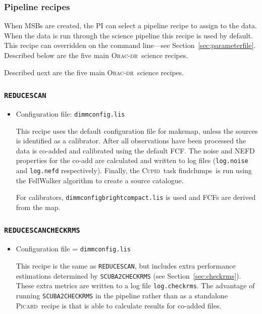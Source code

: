 \documentclass[twoside,11pt]{article}
\newcommand{\htmladdnormallink}[2]{#1}
\newcommand{\htmlref}[2]{#1}
\newenvironment{latexonly}{}{}
\newcommand{\latexhtml}[2]{#1}
\newcommand{\xref}[3]{#1}
\newcommand{\xlabel}[1]{}
\renewcommand{\_}{\texttt{\symbol{95}}}
\newcommand{\cupid}{\xref{\textsc{Cupid}}{sun255}{}}
\newcommand{\oracdr}{\htmladdnormallink{\textsc{Orac-dr}}{http://www.oracdr.org/oracdr}}
\newcommand{\picard}{\xref{\textsc{Picard}}{sun265}{}}
\newcommand{\drrecipe}[1]{\texttt{#1}}
\newcommand{\task}[1]{\textsf{#1}}
\newcommand{\file}[1]{\texttt{#1}}
\newcommand{\makemap}{\xref{\task{makemap}}{sun258}{MAKEMAP}}
\newcommand{\findclumps}{\xref{\task{findclumps}}{sun255}{FINDCLUMPS}}
\newcommand{\cref}[3]{\latexhtml{#1~\ref{#2}}{\htmlref{#3}{#2}}}
\begin{document}
\subsubsection{\xlabel{pl_output}Pipeline recipes}
\label{sec:recipes}

When MSBs are created, the PI can select a pipeline recipe to assign
to the data. When the data is run through the science pipeline this
recipe is used by default. This recipe can overridden on the command
line---see \cref{Section}{sec:parameterfile}{Changing the defaults}.
\begin{latexonly}
Described below are the five main \oracdr\ science recipes.
\end{latexonly}
\begin{htmlonly}
Described next are the five main \oracdr\ science recipes.
\end{htmlonly}

\subsubsection{\xlabel{extsources}\drrecipe{REDUCE\_SCAN}}
\begin{itemize}
\item  Configuration file: \file{dimmconfig.lis}

This recipe uses the default configuration file for \makemap, unless
the sources is identified as a calibrator. After all observations have
been processed the data is co-added and calibrated using the default
FCF.  The noise and NEFD properties for the co-add are calculated and
written to log files (\file{log.noise} and \file{log.nefd}
respectively). Finally, the \cupid\ task \findclumps\ is run using the
FellWalker algorithm to create a source catalogue.

For calibrators, \file{dimmconfig\_bright\_compact.lis} is used and
FCFs are derived from the map.
\end{itemize}

\subsubsection{\xlabel{extsources}\drrecipe{REDUCE\_SCAN\_CHECKRMS}}
\begin{itemize}
\item  Configuration file = \file{dimmconfig.lis}

This recipe is the same as \drrecipe{REDUCE\_SCAN}, but includes extra
performance estimations determined by \drrecipe{SCUBA2\_CHECK\_RMS} (see
\cref{Section}{sec:checkrms}{Getting the noise}). These extra metrics
are written to a log file \file{log.checkrms}. The advantage of running
\drrecipe{SCUBA2\_CHECK\_RMS} in the pipeline rather than as a standalone
\picard\ recipe is that is able to calculate results for co-added
files.
\end{itemize}
\end{document}
